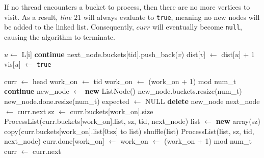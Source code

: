If no thread encounters a bucket to process, then there are no more vertices to visit. As a result, \textit{line $21$} will always evaluate to \texttt{true}, meaning no new nodes will be added to the linked list. Consequently, $curr$ will eventually become \texttt{null}, causing the algorithm to terminate.

\begin{algorithm}
\caption{Wait-Free BFS}
\label{wf_bfs}
\begin{algorithmic}[1]

        \State $u \gets$ L[i]
         \textbf{continue} \EndIf
                \State next\_node.buckets[tid].push\_back($v$)
                \State dist[$v$] $\gets$ dist[$u$] + 1
            \EndIf
        \EndFor
        \State vis[$u$] $\gets$ \texttt{true}
    \EndFor
\EndProcedure

\vspace{0.5cm}

    \State curr $\gets$ head
        \State work\_on $\gets$ tid
                \State work\_on $\gets$ (work\_on + 1) mod num\_t
                \State \textbf{continue}
            \EndIf
                \State new\_node $\gets$ \textbf{new} ListNode()
                \State new\_node.buckets.resize(num\_t)
                \State new\_node.done.resize(num\_t)
                \State expected $\gets$ NULL
                    \State \textbf{delete} new\_node
                \EndIf
            \EndIf
            \State next\_node $\gets$ curr.next
            \State sz $\gets$ curr.buckets[work\_on].size
                \State ProcessList(curr.buckets[work\_on].list, sz, tid, next\_node)
            \Else
                \State list $\gets$ \textbf{new} array(sz)
                \State copy(curr.buckets[work\_on].list[0:sz] to list)
                \State shuffle(list)
                \State ProcessList(list, sz, tid, next\_node)
            \EndIf
            \State curr.done[work\_on] $\gets$ 
            \State work\_on $\gets$ (work\_on + 1) mod num\_t
        \EndFor
        \State curr $\gets$ curr.next
    \EndWhile
\EndProcedure
\end{algorithmic}
\end{algorithm}

